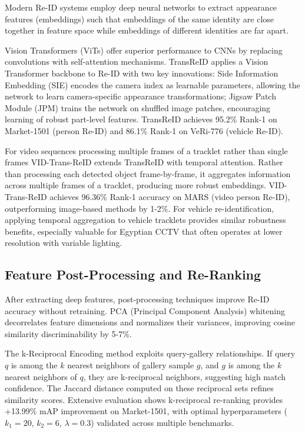 Modern Re-ID systems employ deep neural networks to extract appearance features (embeddings) such that embeddings of the same identity are close together in feature space while embeddings of different identities are far apart.

Vision Transformers (ViTs) offer superior performance to CNNs by replacing convolutions with self-attention mechanisms. TransReID applies a Vision Transformer backbone to Re-ID with two key innovations: Side Information Embedding (SIE) encodes the camera index as learnable parameters, allowing the network to learn camera-specific appearance transformations; Jigsaw Patch Module (JPM) trains the network on shuffled image patches, encouraging learning of robust part-level features. TransReID achieves 95.2\% Rank-1 on Market-1501 (person Re-ID) and 86.1\% Rank-1 on VeRi-776 (vehicle Re-ID).

For video sequences processing multiple frames of a tracklet rather than single frames VID-Trans-ReID extends TransReID with temporal attention. Rather than processing each detected object frame-by-frame, it aggregates information across multiple frames of a tracklet, producing more robust embeddings. VID-Trans-ReID achieves 96.36\% Rank-1 accuracy on MARS (video person Re-ID), outperforming image-based methods by 1-2\%. For vehicle re-identification, applying temporal aggregation to vehicle tracklets provides similar robustness benefits, especially valuable for Egyptian CCTV that often operates at lower resolution with variable lighting.

\subsection{Feature Post-Processing and Re-Ranking}

After extracting deep features, post-processing techniques improve Re-ID accuracy without retraining. PCA (Principal Component Analysis) whitening decorrelates feature dimensions and normalizes their variances, improving cosine similarity discriminability by 5-7\%.

The k-Reciprocal Encoding method exploits query-gallery relationships. If query $q$ is among the $k$ nearest neighbors of gallery sample $g$, and $g$ is among the $k$ nearest neighbors of $q$, they are k-reciprocal neighbors, suggesting high match confidence. The Jaccard distance computed on these reciprocal sets refines similarity scores. Extensive evaluation shows k-reciprocal re-ranking provides +13.99\% mAP improvement on Market-1501, with optimal hyperparameters ($k_1=20$, $k_2=6$, $\lambda=0.3$) validated across multiple benchmarks.

